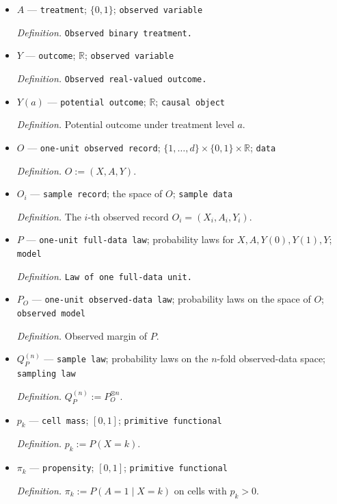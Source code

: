 \documentclass{article}
\begin{document}
\begin{itemize}
  \item \(A\) --- \texttt{treatment}; \(\{0,1\}\); \texttt{observed variable}
  \par\smallskip\noindent\emph{Definition.} \texttt{Observed binary treatment.}
  \item \(Y\) --- \texttt{outcome}; \(\mathbb R\); \texttt{observed variable}
  \par\smallskip\noindent\emph{Definition.} \texttt{Observed real-\allowbreak{}valued outcome.}
  \item \(Y(a)\) --- \texttt{potential outcome}; \(\mathbb R\); \texttt{causal object}
  \par\smallskip\noindent\emph{Definition.} Potential outcome under treatment level \(a\).
  \item \(O\) --- \texttt{one-\allowbreak{}unit observed record}; \(\{1,\ldots,d\}\times\{0,1\}\times\mathbb R\); \texttt{data}
  \par\smallskip\noindent\emph{Definition.} \(O:=(X,A,Y)\).
  \item \(O_i\) --- \texttt{sample record}; the space of \(O\); \texttt{sample data}
  \par\smallskip\noindent\emph{Definition.} The \(i\)-th observed record \(O_i=(X_i,A_i,Y_i)\).
  \item \(P\) --- \texttt{one-\allowbreak{}unit full-\allowbreak{}data law}; probability laws for \(X,A,Y(0),Y(1),Y\); \texttt{model}
  \par\smallskip\noindent\emph{Definition.} \texttt{Law of one full-\allowbreak{}data unit.}
  \item \(P_O\) --- \texttt{one-\allowbreak{}unit observed-\allowbreak{}data law}; probability laws on the space of \(O\); \texttt{observed model}
  \par\smallskip\noindent\emph{Definition.} Observed margin of \(P\).
  \item \(Q_P^{(n)}\) --- \texttt{sample law}; probability laws on the \(n\)-fold observed-data space; \texttt{sampling law}
  \par\smallskip\noindent\emph{Definition.} \(Q_P^{(n)}:=P_O^{\otimes n}\).
  \item \(p_k\) --- \texttt{cell mass}; \([0,1]\); \texttt{primitive functional}
  \par\smallskip\noindent\emph{Definition.} \(p_k:=P(X=k)\).
  \item \(\pi_k\) --- \texttt{propensity}; \([0,1]\); \texttt{primitive functional}
  \par\smallskip\noindent\emph{Definition.} \(\pi_k:=P(A=1\mid X=k)\) on cells with \(p_k>0\).

\end{itemize}
\end{document}
